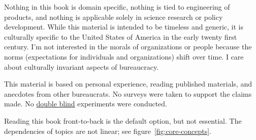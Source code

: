




Nothing in this book is domain specific, nothing is tied to engineering of products, and nothing is applicable solely in science research or policy development. While this material is intended to be timeless and generic, it is culturally specific to the United States of America in the early twenty first century. %
I'm not interested in the morals of organizations or people because the norms (expectations for individuals and organizations) shift over time. 
I care about culturally invariant aspects of bureaucracy. 

This material is based on personal experience, reading published materials, and anecdotes from other bureaucrats. No surveys were taken to support the claims made. No \href{https://en.wikipedia.org/wiki/Blinded_experiment}{double blind} experiments were conducted. 

Reading this book front-to-back is the default option, but not essential. The dependencies of topics are not linear; see figure~\ref{fig:core-concepts}.

